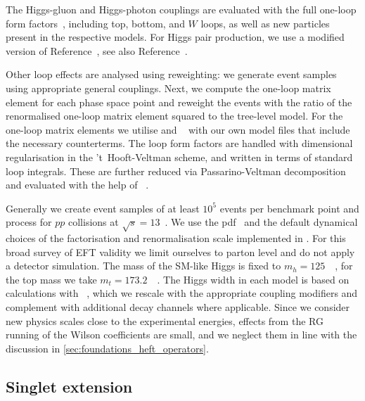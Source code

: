 The Higgs-gluon and Higgs-photon couplings are evaluated with the full
one-loop form fac\-tors~\cite{Djouadi:2005gi}, including top, bottom,
and $W$ loops, as well as new particles present in the respective
models. For Higgs pair production, we use a modified version of
Reference~\cite{higgspaircode}, see also
Reference~\cite{Hespel:2014sla}.

Other loop effects are analysed using reweighting: we generate event
samples using appropriate general couplings. Next, we compute the
one-loop matrix element for each phase space point and reweight the
events with the ratio of the renormalised one-loop matrix element
squared to the tree-level model. For the one-loop matrix elements we
utilise  and ~\cite{Hahn:2000kx}
with our own model files that include the necessary counterterms. The
loop form factors are handled with dimensional regularisation in the
't~Hooft-Veltman scheme, and written in terms of standard loop
integrals. These are further reduced via Passarino-Veltman
decomposition and evaluated with the help of
~\cite{Hahn:1998yk}.

Generally we create event samples of at least $10^5$ events per
benchmark point and process for $pp$ collisions at
$\sqrt{s} = 13$~\tev. We use the 
pdf~\cite{Pumplin:2002vw} and the default dynamical choices of the
factorisation and renormalisation scale implemented in
. For this broad survey of EFT validity we limit
ourselves to parton level and do not apply a detector simulation. The
mass of the SM-like Higgs is fixed to
$m_h = 125$~\gev~\cite{Aad:2015zhl}, for the top mass we take
$m_t = 173.2$~\gev~\cite{Tevatron:2014cka, ATLAS:2014wva}. The Higgs
width in each model is based on calculations with
~\cite{Djouadi:1997yw}, which we rescale with the
appropriate coupling modifiers and complement with additional decay
channels where applicable. Since we consider new physics scales close
to the experimental energies, effects from the RG running of the
Wilson coefficients are small, and we neglect them in line with the
discussion in \autoref{sec:foundations_heft_operators}.



\subsection{Singlet extension}
\label{sec:validity_singlet}

